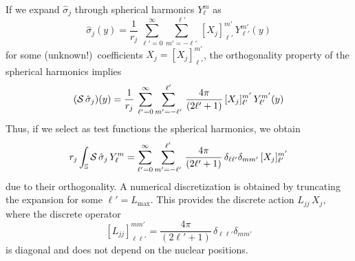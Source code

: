 If we expand $\hat{\sigma}_j$ through spherical harmonics $Y_\ell^m$ as
\[
\hat{\sigma}_j(y) = \frac{1}{r_j} \, \sum_{\ell'= 0}^{\infty} \sum_{m' = -\ell'}^{\ell'} \,  [X_j]_{\ell'}^{m'} \, Y_{\ell'}^{m'}(y)
\]
for some (unknown!)~coefficients $X_j = [X_j]_{\ell'}^{m'}$, the orthogonality property of the spherical harmonics implies
\[
(\mathcal{S} \, \hat{\sigma}_j)(y) = \frac{1}{r_j} \, \sum_{\ell'= 0}^{\infty} \sum_{m' = -\ell'}^{\ell'} \, \frac{4\pi}{(2\ell' + 1)}\, [X_j]_{\ell'}^{m'} \, Y_{\ell'}^{m'}(y)
\]
Thus, if we select as test functions the spherical harmonics, we obtain
\begin{equation*}%
r_j\int_\mathbb{S} \cS \, \hat{\sigma}_j \, Y_\ell^m = \sum_{\ell'= 0}^{\infty} \sum_{m' = -\ell'}^{\ell'} \, \frac{4\pi}{(2\ell' + 1)} \, \delta_{\ell \ell'} \delta_{m m'}\, [X_j]_{\ell'}^{m'} 
\end{equation*}
due to their orthogonality. A numerical discretization is obtained by truncating the expansion for some $\ell'=L_\text{max}$. This provides the discrete action $L_{jj} \, X_j$, where the discrete operator
\begin{equation}\label{eq:61}
 [L_{jj}]_{\ell \ell'}^{m m'} =  \frac{4\pi}{(2\ell' + 1)} \, \delta_{\ell \ell'} \delta_{m m'}
\end{equation}
is diagonal and does not depend on the nuclear positions.

